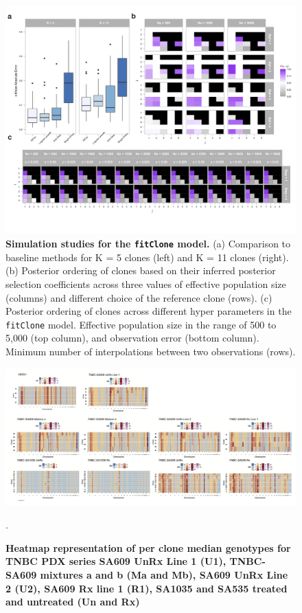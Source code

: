 \begin{figure}
\centering
  \includegraphics[width=\textwidth]{Figures/simulationspdx.png}
	
\caption[Simulation studies for the \texttt{fitClone} model]
	{\small
	\textbf{Simulation studies for the \texttt{fitClone} model.}
	  (a) Comparison to baseline methods for K = 5 clones (left) and K = 11 clones (right). (b) Posterior ordering of clones based on their inferred posterior selection coefficients across three values of effective population size (columns) and different choice of the reference clone (rows). (c) Posterior ordering of clones across different hyper parameters in the \texttt{fitClone} model. Effective population size in the range of 500 to 5,000 (top column), and observation error (bottom column). Minimum number of interpolations between two observations (rows).}
\label{fig:simulations}
\end{figure}


\begin{figure}
\centering
  \includegraphics[width=\textwidth]{Figures/chap4/mediangenotypespdx.png}
\caption[Heatmaps of median genotypes]
	{\small
	\textbf{Heatmap representation of per clone median genotypes for TNBC PDX series SA609 UnRx Line 1 (U1), TNBC-SA609 mixtures a and b (Ma and Mb), SA609 UnRx Line 2 (U2), SA609 Rx line 1 (R1), SA1035 and SA535 treated and untreated (Un and Rx)}}.
	  
	 	\label{fig:mediangenotypes}
\end{figure} 

